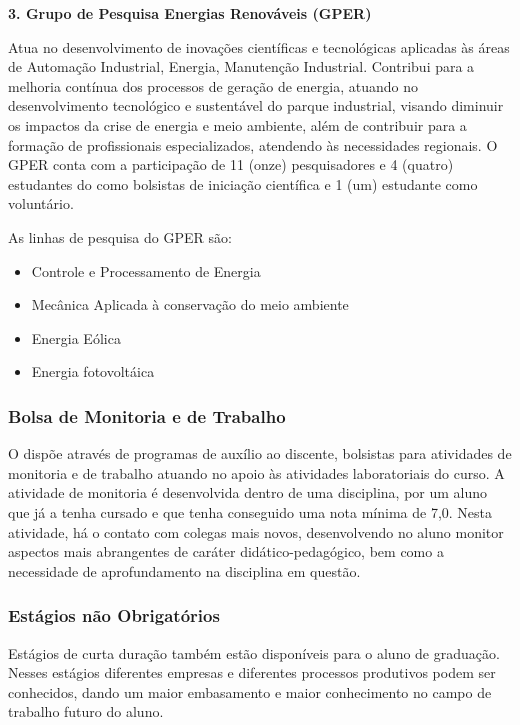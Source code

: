 \noindent \textbf{3. Grupo de Pesquisa Energias Renováveis (GPER)}

Atua no desenvolvimento de inovações científicas e tecnológicas aplicadas às áreas de Automação Industrial, Energia, Manutenção Industrial. Contribui para a melhoria contínua dos processos de geração de energia, atuando no desenvolvimento tecnológico e sustentável do parque industrial, visando diminuir os impactos da crise de energia e meio ambiente, além de contribuir para a formação de profissionais especializados, atendendo às necessidades regionais. O GPER conta com a participação de 11 (onze) pesquisadores e 4 (quatro) estudantes do \NOMECURSO como bolsistas de iniciação científica e 1 (um) estudante como voluntário.

As linhas de pesquisa do GPER são:
\begin{itemize}
	\item Controle e Processamento de Energia
	\item Mecânica Aplicada à conservação do meio ambiente
	\item Energia Eólica
	\item Energia fotovoltáica
\end{itemize}

\subsubsection{Bolsa de Monitoria e de Trabalho}

O \NOMECURSO dispõe através de programas de auxílio ao discente, bolsistas para atividades de monitoria e de trabalho atuando no apoio às atividades laboratoriais do curso. A atividade de monitoria é desenvolvida dentro de uma disciplina, por um aluno que já a tenha cursado e que tenha conseguido uma nota mínima de 7,0. Nesta atividade, há o contato com colegas mais novos, desenvolvendo no aluno monitor aspectos mais abrangentes de caráter didático-pedagógico, bem como a necessidade de aprofundamento na disciplina em questão.

\subsubsection{Estágios não Obrigatórios}
Estágios de curta duração também estão disponíveis para o aluno de graduação.
Nesses estágios diferentes empresas e diferentes processos produtivos podem ser
conhecidos, dando um maior embasamento e maior conhecimento no campo de
trabalho futuro do aluno.



